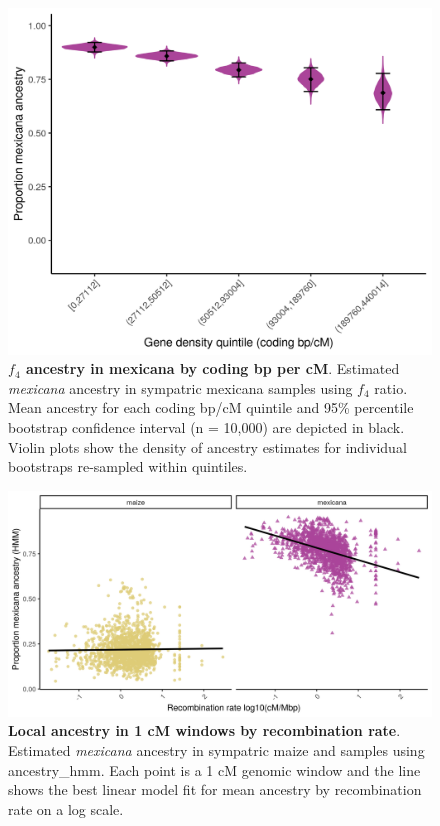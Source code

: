 \begin{figure}[ht]
\includegraphics[width=\textwidth]{chapter2/figures/f4_sympatric_mexicana_pop22_bycd5.png}
\caption{\color{Gray} \textbf{$f_4$ ancestry in mexicana by coding bp per cM}. Estimated \textit{mexicana} ancestry in sympatric mexicana samples using $f_4$ ratio. Mean ancestry for each coding bp/cM quintile and 95\% percentile bootstrap confidence interval (n = 10,000) are depicted in black. Violin plots show the density of ancestry estimates for individual bootstraps re-sampled within quintiles.}
\label{f4_mexicana_by_cd}
\end{figure}


\begin{figure}[ht]
\includegraphics[width=\textwidth]{chapter2/figures/local_anc_by_r_continuous.png}
\caption{\color{Gray} \textbf{Local \mexicana ancestry in 1 cM windows by recombination rate}. Estimated \textit{mexicana} ancestry in sympatric maize and \mexicana samples using ancestry\_hmm. Each point is a 1 cM genomic window and the line shows the best linear model fit for mean \mexicana ancestry by recombination rate on a log scale.}
\label{local_ancestry_mexicana_by_log10r}
\end{figure}

